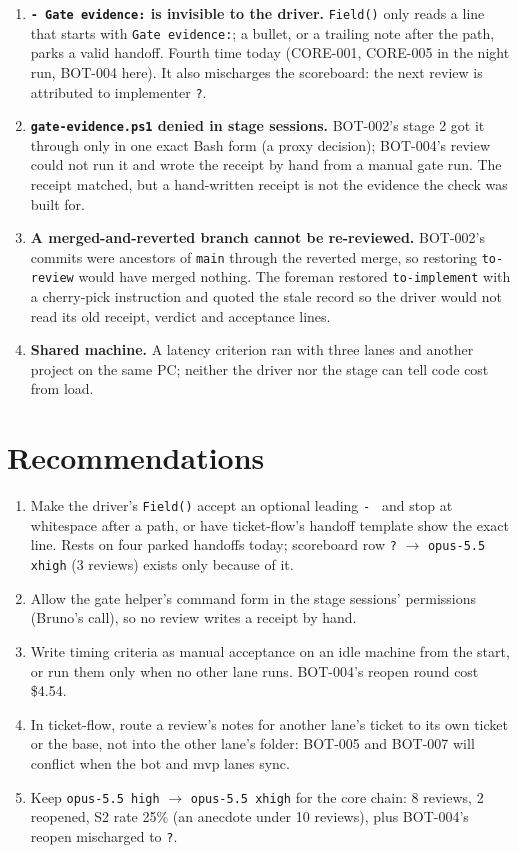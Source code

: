 \documentclass[11pt,a4paper]{article}
\begin{document}
\begin{enumerate}
  \item \textbf{\texttt{- Gate evidence:} is invisible to the driver.} \texttt{Field()} only
        reads a line that starts with \texttt{Gate evidence:}; a bullet, or a trailing note
        after the path, parks a valid handoff. Fourth time today (CORE-001, CORE-005 in the
        night run, BOT-004 here). It also mischarges the scoreboard: the next review is
        attributed to implementer \texttt{?}.
  \item \textbf{\texttt{gate-evidence.ps1} denied in stage sessions.} BOT-002's stage 2 got it
        through only in one exact Bash form (a proxy decision); BOT-004's review could not run
        it and wrote the receipt by hand from a manual gate run. The receipt matched, but a
        hand-written receipt is not the evidence the check was built for.
  \item \textbf{A merged-and-reverted branch cannot be re-reviewed.} BOT-002's commits were
        ancestors of \texttt{main} through the reverted merge, so restoring
        \texttt{to-review} would have merged nothing. The foreman restored
        \texttt{to-implement} with a cherry-pick instruction and quoted the stale record so
        the driver would not read its old receipt, verdict and acceptance lines.
  \item \textbf{Shared machine.} A latency criterion ran with three lanes and another project
        on the same PC; neither the driver nor the stage can tell code cost from load.
\end{enumerate}

\section*{Recommendations}

\begin{enumerate}
  \item Make the driver's \texttt{Field()} accept an optional leading \texttt{- } and stop at
        whitespace after a path, or have ticket-flow's handoff template show the exact line.
        Rests on four parked handoffs today; scoreboard row \texttt{?} $\rightarrow$
        \texttt{opus-5.5 xhigh} (3 reviews) exists only because of it.
  \item Allow the gate helper's command form in the stage sessions' permissions (Bruno's
        call), so no review writes a receipt by hand.
  \item Write timing criteria as manual acceptance on an idle machine from the start, or run
        them only when no other lane runs. BOT-004's reopen round cost \$4.54.
  \item In ticket-flow, route a review's notes for another lane's ticket to its own ticket or
        the base, not into the other lane's folder: BOT-005 and BOT-007 will conflict when
        the bot and mvp lanes sync.
  \item Keep \texttt{opus-5.5 high} $\rightarrow$ \texttt{opus-5.5 xhigh} for the core chain:
        8 reviews, 2 reopened, S2 rate 25\% (an anecdote under 10 reviews), plus BOT-004's
        reopen mischarged to \texttt{?}.
\end{enumerate}
\end{document}
